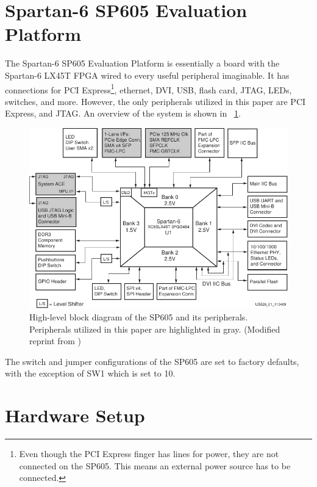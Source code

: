 \TODO

\section{Spartan-6 SP605 Evaluation Platform}

The Spartan-6 SP605 Evaluation Platform is essentially a board with the Spartan-6 LX45T FPGA wired to every useful peripheral imaginable.
It has connections for PCI Express\footnote{
        Even though the PCI Express finger has lines for power, they are not connected on the SP605. This means an external power source has to be connected.
    }, ethernet, DVI, USB, flash card, JTAG, LEDs, switches, and more.
However, the only peripherals utilized in this paper are PCI Express, and JTAG.
An overview of the system is shown in \figurename~\ref{fig:sp605}.

\begin{figure}[!ht]
    \centering
    \includegraphics[width=\textwidth]{figures/sp605-modified}
    \caption[SP605]{
        High-level block diagram of the SP605 and its peripherals.
        Peripherals utilized in this paper are highlighted in gray.
        (Modified reprint from \cite{ug526})
    }
    \label{fig:sp605}
\end{figure}

The switch and jumper configurations of the SP605 are set to factory defaults, with the exception of SW1 which is set to 10.

\section{Hardware Setup}

